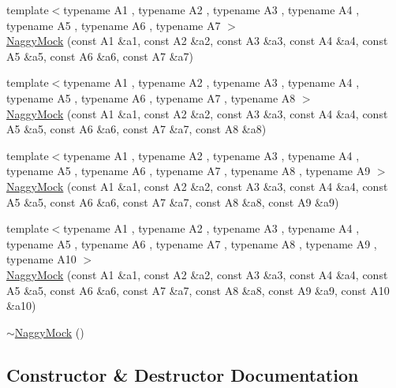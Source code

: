 \begin{DoxyCompactItemize}
\item 
{\footnotesize template$<$typename A1 , typename A2 , typename A3 , typename A4 , typename A5 , typename A6 , typename A7 $>$ }\\\mbox{\hyperlink{classtesting_1_1NaggyMock_ad1edac1991dd20514e822c90d6896c74}{Naggy\+Mock}} (const A1 \&a1, const A2 \&a2, const A3 \&a3, const A4 \&a4, const A5 \&a5, const A6 \&a6, const A7 \&a7)
\item 
{\footnotesize template$<$typename A1 , typename A2 , typename A3 , typename A4 , typename A5 , typename A6 , typename A7 , typename A8 $>$ }\\\mbox{\hyperlink{classtesting_1_1NaggyMock_a63b30506f56b792ffbdc5792a9630d5e}{Naggy\+Mock}} (const A1 \&a1, const A2 \&a2, const A3 \&a3, const A4 \&a4, const A5 \&a5, const A6 \&a6, const A7 \&a7, const A8 \&a8)
\item 
{\footnotesize template$<$typename A1 , typename A2 , typename A3 , typename A4 , typename A5 , typename A6 , typename A7 , typename A8 , typename A9 $>$ }\\\mbox{\hyperlink{classtesting_1_1NaggyMock_a786f31ade7b8b9f6e78e07f51cc0e14b}{Naggy\+Mock}} (const A1 \&a1, const A2 \&a2, const A3 \&a3, const A4 \&a4, const A5 \&a5, const A6 \&a6, const A7 \&a7, const A8 \&a8, const A9 \&a9)
\item 
{\footnotesize template$<$typename A1 , typename A2 , typename A3 , typename A4 , typename A5 , typename A6 , typename A7 , typename A8 , typename A9 , typename A10 $>$ }\\\mbox{\hyperlink{classtesting_1_1NaggyMock_aa40a39806b939f423696f9380de3172b}{Naggy\+Mock}} (const A1 \&a1, const A2 \&a2, const A3 \&a3, const A4 \&a4, const A5 \&a5, const A6 \&a6, const A7 \&a7, const A8 \&a8, const A9 \&a9, const A10 \&a10)
\item 
\mbox{\hyperlink{classtesting_1_1NaggyMock_a9d00e4811942489b4c3cdd8e8c658518}{$\sim$\+Naggy\+Mock}} ()
\end{DoxyCompactItemize}


\subsection{Constructor \& Destructor Documentation}
\mbox{\label{classtesting_1_1NaggyMock_acb769f78b93eb60b04db21250f416f70}} 
